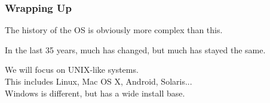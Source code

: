 \begin{frame}
\frametitle{Wrapping Up}
The history of the OS is obviously more complex than this.

In the last 35 years, much has changed, but much has stayed the same.

We will focus on UNIX-like systems.\\
\quad This includes Linux, Mac OS X, Android, Solaris...\\
\quad Windows is different, but has a wide install base.


\end{frame}




